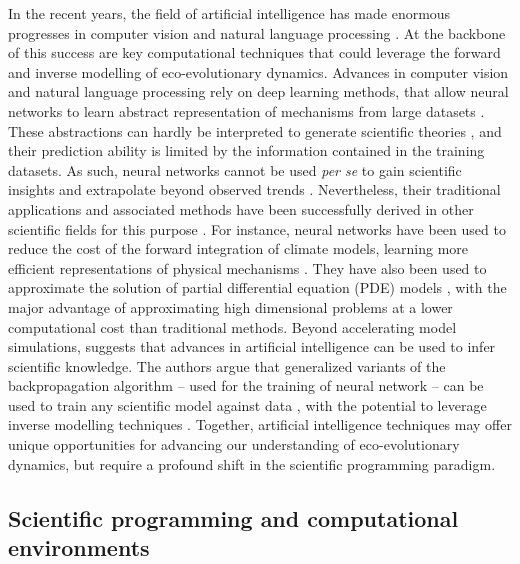 \label{subsec:artificial intelligence}
In the recent years, the field of artificial intelligence has made enormous progresses in computer vision \citep{voulodimos2018deep} and natural language processing \citep{young2018recent}. At the backbone of this success are key computational techniques that could leverage the forward and inverse modelling of eco-evolutionary dynamics.
% 
Advances in computer vision and natural language processing rely on deep learning methods, that allow neural networks to learn abstract representation of mechanisms from large datasets \citep{LeCun2015}.
% 
These abstractions can hardly be interpreted to generate scientific theories \citep{Karpatne2017}, and their prediction ability is limited by the information contained in the training datasets. As such, neural networks cannot be used \textit{per se} to gain scientific insights and extrapolate beyond observed trends \citep{Barnosky2012,Urban2016}.
% 
Nevertheless, their traditional applications and associated methods have been successfully derived in other scientific fields for this purpose \citep{Kashinath2021,Schneider2017,Yazdani2020,Rolnick2023}.
%
For instance, neural networks have been used to reduce the cost of the forward integration of climate models, learning more efficient representations of physical mechanisms \citep{Kashinath2021}.
% 
They have also been used to approximate the solution of partial differential equation (PDE) models \citep{Sirignano2018dgm,Han2018}, with the major advantage of approximating high dimensional problems at a lower computational cost than traditional methods.
% 
Beyond accelerating model simulations, \cite{Rackauckas2020a} suggests that advances in artificial intelligence can be used to infer scientific knowledge. The authors argue that generalized variants of the backpropagation algorithm -- used for the training of neural network \citep{LeCun2015}-- can be used to train any scientific model against data \citep{Rackauckas2020a}, with the potential to leverage inverse modelling techniques \citep{Frank2022}. 
% 
Together, artificial intelligence techniques may offer unique opportunities for advancing our understanding of eco-evolutionary dynamics, but require a profound shift in the scientific programming paradigm.


\subsection{Scientific programming and computational environments}

